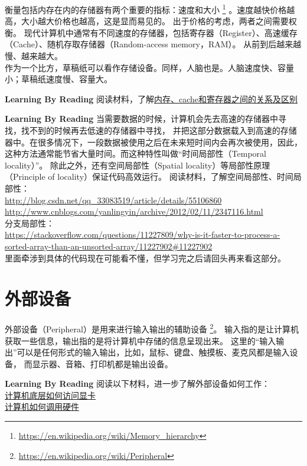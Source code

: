 衡量包括内存在内的存储器有两个重要的指标：速度和大小
\footnote{\url{https://en.wikipedia.org/wiki/Memory_hierarchy}}
。速度越快价格越高，大小越大价格也越高，这是显而易见的。
出于价格的考虑，两者之间需要权衡。
现代计算机中通常有不同速度的存储器，包括寄存器（Register）、高速缓存（Cache）、随机存取存储器（Random-access memory，RAM）。
从前到后越来越慢、越来越大。\\
作为一个比方，草稿纸可以看作存储设备。同样，人脑也是。人脑速度快、容量小；草稿纸速度慢、容量大。
\begin{paperbox}{\textbf{Learning By Reading}\starthree}
阅读材料，了解\href{http://blog.csdn.net/hellojoy/article/details/54744231}{内存、cache和寄存器之间的关系及区别}
\end{paperbox}
\begin{paperbox}{\textbf{Learning By Reading}\startwo}
当需要数据的时候，计算机会先去高速的存储器中寻找，找不到的时候再去低速的存储器中寻找，
并把这部分数据载入到高速的存储器中。在很多情况下，一段数据被使用之后在未来短时间内会再次被使用，因此，
这种方法通常能节省大量时间。而这种特性叫做“时间局部性（Temporal locality）”。
除此之外，还有空间局部性（Spatial locality）等局部性原理（Principle of locality）保证代码高效运行。
阅读材料，了解空间局部性、时间局部性：\\
\url{http://blog.csdn.net/qq_33083519/article/details/55106860}\\
\url{http://www.cnblogs.com/yanlingyin/archive/2012/02/11/2347116.html}\\
分支局部性：\\
\url{https://stackoverflow.com/questions/11227809/why-is-it-faster-to-process-a-sorted-array-than-an-unsorted-array/11227902#11227902}\\
里面牵涉到具体的代码现在可能看不懂，但学习完之后请回头再来看这部分。
\end{paperbox}
\section{外部设备}
外部设备（Peripheral）是用来进行输入输出的辅助设备
\footnote{\url{https://en.wikipedia.org/wiki/Peripheral}}。
输入指的是让计算机获取一些信息，输出指的是将计算机中存储的信息呈现出来。
这里的“输入输出”可以是任何形式的输入输出，比如，鼠标、键盘、触摸板、麦克风都是输入设备，
而显示器、音箱、打印机都是输出设备。\\
\begin{paperbox}{\textbf{Learning By Reading}\starone}
阅读以下材料，进一步了解外部设备如何工作：\\
\href{https://www.zhihu.com/question/20722310}{计算机底层如何访问显卡}\\
\href{https://www.zhihu.com/question/39846396}{计算机如何调用硬件}
\end{paperbox}
